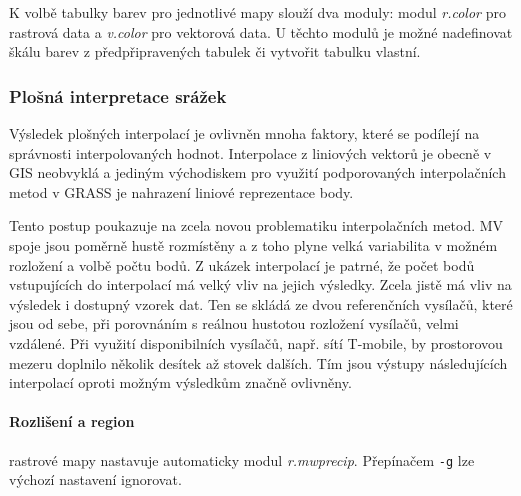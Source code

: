 \documentclass[a4paper,12pt,oneside]{report}
\begin{document}
K volbě tabulky barev pro jednotlivé mapy slouží dva moduly: modul \textit{r.color} pro rastrová data
a \textit{v.color} pro vektorová data. U těchto modulů je možné
nadefinovat škálu barev z předpřipravených tabulek či vytvořit
tabulku vlastní.

\subsubsection{Plošná interpretace srážek}
Výsledek plošných interpolací je ovlivněn mnoha faktory, které se
podílejí na správnosti interpolovaných hodnot.  Interpolace z
liniových vektorů je obecně v GIS neobvyklá a jediným východiskem pro
využití podporovaných interpolačních metod v GRASS je nahrazení
liniové reprezentace body.

Tento postup poukazuje na zcela novou problematiku interpolačních
metod. MV spoje jsou poměrně hustě rozmístěny a z toho plyne velká
variabilita v možném rozložení a volbě počtu bodů. Z ukázek
interpolací je patrné, že počet bodů vstupujících do interpolací má
velký vliv na jejich výsledky. Zcela jistě má vliv na výsledek i
dostupný vzorek dat. Ten se skládá ze dvou referenčních vysílačů,
které jsou od sebe, při porovnáním s reálnou hustotou rozložení
vysílačů, velmi vzdálené. Při využití disponibilních vysílačů, např.
sítí T-mobile, by prostorovou mezeru doplnilo několik desítek až
stovek dalších. Tím jsou výstupy následujících interpolací oproti
možným výsledkům značně ovlivněny. 


\paragraph*{Rozlišení a region} rastrové mapy nastavuje automaticky
modul \textit{r.mwprecip}. Přepínačem \texttt{-g} lze výchozí
nastavení ignorovat. 


\end{document}
